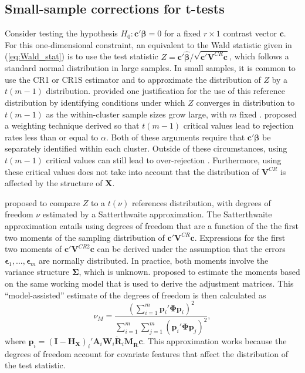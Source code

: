 \documentclass[12pt]{article}\usepackage[]{graphicx}\usepackage[]{color}
\newcommand{\E}{\text{E}}
\newcommand{\Var}{\text{Var}}
\newcommand{\bm}{\mathbf}
\newcommand{\bs}{\boldsymbol}
\begin{document}
\subsection{Small-sample corrections for t-tests}
\label{subsec:t-tests}

Consider testing the hypothesis $H_0: \bm{c}'\bs\beta = 0$ for a fixed $r \times 1$ contrast vector $\bm{c}$. 
For this one-dimensional constraint, an equivalent to the Wald statistic given in (\ref{eq:Wald_stat}) is to use the test statistic $Z = \bm{c}'\bs{\hat\beta} / \sqrt{\bm{c}'\bm{V}^{CR}\bm{c}}$, which follows a standard normal distribution in large samples. 
In small samples, it is common to use the CR1 or CR1S estimator and to approximate the distribution of $Z$ by a $t(m - 1)$ distribution. 
\citet{Hansen2007asymptotic} provided one justification for the use of this reference distribution by identifying conditions under which $Z$ converges in distribution to $t(m-1)$ as the within-cluster sample sizes grow large, with $m$ fixed \citep[see also][]{Donald2007inference}. 
\citet{Ibragimov2010tstatistic} proposed a weighting technique derived so that $t(m-1)$ critical values lead to rejection rates less than or equal to $\alpha$.
Both of these arguments require that $\bm{c}'\bs\beta$ be separately identified within each cluster. 
Outside of these circumstances, using $t(m-1)$ critical values can still lead to over-rejection \citep{Cameron2015practitioners}. 
Furthermore, using these critical values does not take into account that the distribution of $\bm{V}^{CR}$ is affected by the structure of $\bm{X}$. 

\citet{Bell2002bias} proposed to compare $Z$ to a $t(\nu)$ references distribution, with degrees of freedom $\nu$ estimated by a Satterthwaite approximation.
The Satterthwaite approximation \citep{Satterthwaite1946approximate} entails using degrees of freedom that are a function of the the first two moments of the sampling distribution of $\bm{c}' \bm{V}^{CR} \bm{c}$.
Expressions for the first two moments of $\bm{c}'\bm{V}^{CR2}\bm{c}$ can be derived under the assumption that the errors $\bs\epsilon_1,...,\bs\epsilon_m$ are normally distributed. 
In practice, both moments involve the variance structure $\bs\Sigma$, which is unknown. 
\citet{Bell2002bias} proposed to estimate the moments based on the same working model that is used to derive the adjustment matrices. 
This ``model-assisted'' estimate of the degrees of freedom is then calculated as 
\begin{equation}
\label{eq:nu_model}
\nu_{M} = \frac{\left(\sum_{i=1}^m \bm{p}_i' \bs\Phi \bm{p}_i\right)^2}{\sum_{i=1}^m \sum_{j=1}^m \left(\bm{p}_i' \bs\Phi \bm{p}_j\right)^2},
\end{equation}
where $\bm{p}_i = \left(\bm{I} - \bm{H_X}\right)_i'\bm{A}_i \bm{W}_i\bm{\ddot{R}}_i\bm{M_{\ddot{R}}} \bm{c}$.
This approximation works because the degrees of freedom account for covariate features that affect the distribution of the test statistic. 
\end{document}

